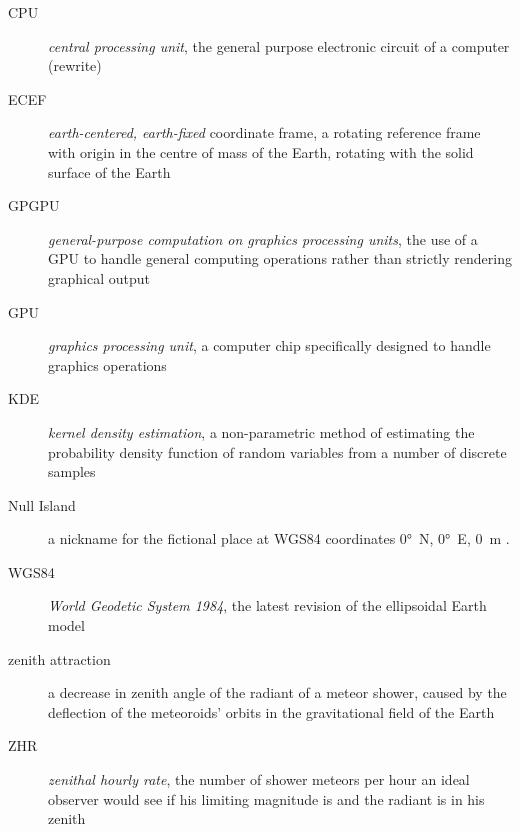 \begin{description}
    \item[CPU]
        \emph{central processing unit}, the general purpose electronic circuit of a computer \cite{...} (rewrite)
    \item[ECEF]
        \emph{earth-centered, earth-fixed} coordinate frame, a rotating reference frame with origin
        in the centre of mass of the Earth, rotating with the solid surface of the Earth \cite{ecef}
    \item[GPGPU]
        \emph{general-purpose computation on graphics processing units},
        the use of a GPU to handle general computing operations rather than strictly rendering graphical output \cite{techterms}
    \item[GPU]
        \emph{graphics processing unit}, a computer chip specifically designed to handle graphics operations \cite{techterms}
    \item[KDE]
        \emph{kernel density estimation}, a non-parametric method of estimating the probability density function
        of random variables from a number of discrete samples \cite{kde}
    \item[Null Island]
        a nickname for the fictional place at WGS84 coordinates \ang{0}~N, \ang{0}~E, \SI{0}{\metre} \cite{null-island}.
    \item[WGS84]
        \emph{World Geodetic System 1984}, the latest revision of the ellipsoidal Earth model \cite{wgs84}
    \item[zenith attraction]
        a decrease in zenith angle of the radiant of a meteor shower, caused by the deflection of the meteoroids' orbits in the
        gravitational field of the Earth \cite{lovell1954}
    \item[ZHR]
        \emph{zenithal hourly rate}, the number of shower meteors per hour an ideal observer would see
            if his limiting magnitude is  and the radiant is in his zenith \cite{imo-glossary}

\end{description}
